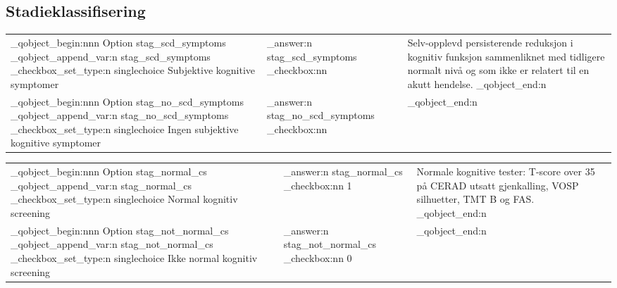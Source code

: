 \documentclass[pdf,  style=code128, globalid=OMRCRFv5.0.2, english, stamp, pagemark, oneside]{sdapsclassic}
\begin{document}
\begin{questionnaire}
 		\section{Stadieklassifisering}

 		\ExplSyntaxOn
 \newcommand{\diagrowrest}[4]{
 	\sdaps_qobject_begin:nnn {  } { Option } {stag_#4}
 	\sdaps_qobject_append_var:n {stag_#4}
 	\sdaps_checkbox_set_type:n {singlechoice}
 				#1 &
 	\sdaps_answer:n { stag_#4} \vbox{ \vspace{3pt} \sdaps_checkbox:nn {} {#2} } &
 	#3
 	\sdaps_qobject_end:n {}
 }
 \ExplSyntaxOff

 \begin{longtable}{|p{4cm} | p{0.5cm} | p{12cm}|}
   \hline
   \diagrowrest{Subjektive kognitive symptomer }{}{Selv-opplevd persisterende reduksjon i kognitiv funksjon sammenliknet med tidligere normalt nivå og som ikke er relatert til en akutt hendelse.}{scd_symptoms}
     \\

   \diagrowrest{Ingen subjektive kognitive symptomer}{}{}{no_scd_symptoms}

     \\
     \hline
 \end{longtable}

   \begin{longtable}{|p{4cm} | p{0.5cm} | p{12cm}|}
     \hline

     \diagrowrest{Normal kognitiv screening }{1}{Normale kognitive tester: T-score over 35 på CERAD utsatt gjenkalling, VOSP silhuetter, TMT B og FAS.}{normal_cs}
     \\
     \diagrowrest{Ikke normal kognitiv screening}{0}{}{not_normal_cs}
     \\
       \hline
   \end{longtable}

 \begin{longtable}{|p{4cm} | p{0.5cm} | p{12cm}|}


\end{longtable}
\end{questionnaire}
\end{document}
